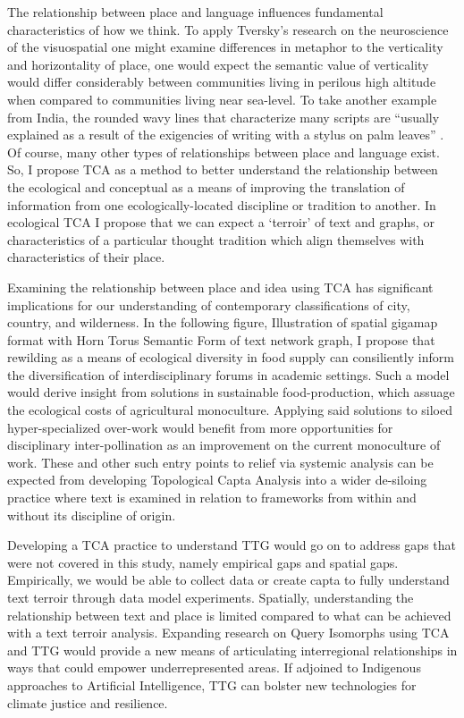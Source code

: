The relationship between place and language influences fundamental characteristics of how we think. To apply Tversky’s research on the neuroscience of the visuospatial one might examine differences in metaphor to the verticality and horizontality of place, one would expect the semantic value of verticality would differ considerably between communities living in perilous high altitude when compared to communities living near sea-level. To take another example from India, the rounded wavy lines that characterize many scripts are “usually explained as a result of the exigencies of writing with a stylus on palm leaves” \citep[p. 39]{salomon_indian_1998}. Of course, many other types of relationships between place and language exist. So, I propose TCA as a method to better understand the relationship between the ecological and conceptual as a means of improving the translation of information from one ecologically-located discipline or tradition to another. In ecological TCA I propose that we can expect a ‘terroir’ of text and graphs, or characteristics of a particular thought tradition which align themselves with characteristics of their place. 

Examining the relationship between place and idea using TCA has significant implications for our understanding of contemporary classifications of city, country, and wilderness. In the following figure, Illustration of spatial gigamap format with Horn Torus Semantic Form of text network graph, I propose that rewilding as a means of ecological diversity in food supply can consiliently inform the diversification of interdisciplinary forums in academic settings. Such a model would derive insight from solutions in sustainable food-production, which assuage the ecological costs of agricultural monoculture. Applying said solutions to siloed hyper-specialized over-work would benefit from more opportunities for disciplinary inter-pollination as an improvement on the current monoculture of work. These and other such entry points to relief via systemic analysis can be expected from developing Topological Capta Analysis into a wider de-siloing practice where text is examined in relation to frameworks from within and without its discipline of origin. 

Developing a TCA practice to understand TTG would go on to address gaps that were not covered in this study, namely empirical gaps and spatial gaps. Empirically, we would be able to collect data or create capta to fully understand text terroir through data model experiments. Spatially, understanding the relationship between text and place is limited compared to what can be achieved with a text terroir analysis. Expanding research on Query Isomorphs using TCA and TTG would provide a new means of articulating interregional relationships in ways that could empower underrepresented areas. If adjoined to Indigenous approaches to Artificial Intelligence, TTG can bolster new technologies for climate justice and resilience.


